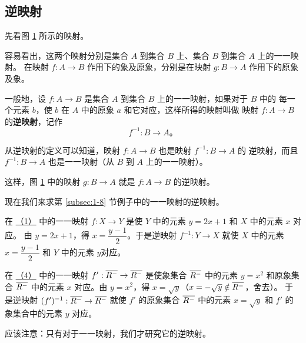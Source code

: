 \subsection{逆映射}\label{subsec:1-9}

先看图 \ref{fig:1-24} 所示的映射。

容易看出，这两个映射分别是集合 $A$ 到集合 $B$ 上、集合 $B$ 到集合 $A$ 上的一一映射。
在映射 $f: A \to B$ 作用下的象及原象，分别是在映射 $g: B \to A$ 作用下的原象及象。

\begin{figure}[htbp]
    \centering
    \begin{minipage}{8cm}
    \centering
    
    \end{minipage}
    \qquad
    \begin{minipage}{8cm}
    \centering
    
    \end{minipage}
    \caption{}\label{fig:1-24}
\end{figure}

一般地，设 $f: A \to B$ 是集合 $A$ 到集合 $B$ 上的一一映射，如果对于 $B$ 中的
每一个元素 $b$，使 $b$ 在 $A$ 中的原象 $a$ 和它对应，这样所得的映射叫做
映射 $f: A \to B$ 的\textbf{逆映射}，记作
$$f^{-1}: B \to A \text{。}$$

从逆映射的定义可以知道，映射 $f: A \to B$ 也是映射 $f^{-1}: B \to A$ 的
逆映射，而且 $f^{-1}: B \to A$ 也是一一映射（从 $B$ 到 $A$ 上的一一映射）。

这样，图 \ref{fig:1-24} 中的映射 $g: B \to A$ 就是 $f: A \to B$ 的逆映射。

现在我们来求第 \ref{subsec:1-8} 节例子中的一一映射的逆映射。

在 \hyperref[li:1-8-1]{（1）} 中的一一映射 $f: X \to Y$ 是使 $Y$ 中的元素 $y = 2x + 1$ 和 $X$ 中的元素 $x$ 对应。
由 $y = 2x + 1$，得 $x = \dfrac{y -1}{2}$。于是逆映射 $f^{-1}: Y \to X$ 就使 $X$ 中的元素
$x = \dfrac{y-1}{2}$ 和 $Y$ 中的元素 $y$对应。

在 \hyperref[li:1-8-4]{（4）} 中的一一映射 $f': \overline{R^-} \to \overline{R^-}$ 是使象集合 $\overline{R^-}$ 中的元素 $y=x^2$
和原象集合 $\overline{R^-}$ 中的元素 $x$ 对应。由 $y = x^2$，得 $x = \sqrt{y}$（$x = -\sqrt{y} \notin \overline{R^-}$，舍去）。
于是逆映射 $(f')^{-1}: \overline{R^-} \to \overline{R^-}$ 就使 $f'$ 的原象集合 $\overline{R^-}$ 中的元素
$x = \sqrt{y}$ 和 $f'$ 的象集合中的元素 $y$ 对应。

应该注意：只有对于一一映射，我们才研究它的逆映射。

\lianxi

